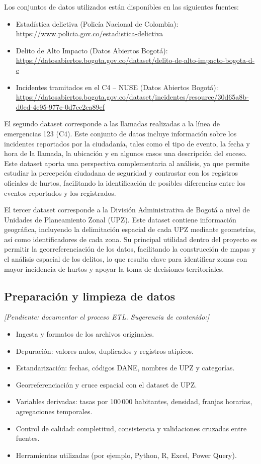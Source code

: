 \documentclass[12pt,letterpaper]{article}
\begin{document}
Los conjuntos de datos utilizados están disponibles en las siguientes fuentes:
\begin{itemize}[noitemsep, topsep=0pt]
    \item Estadística delictiva (Policía Nacional de Colombia): \url{https://www.policia.gov.co/estadistica-delictiva}
    \item Delito de Alto Impacto (Datos Abiertos Bogotá): \url{https://datosabiertos.bogota.gov.co/dataset/delito-de-alto-impacto-bogota-d-c}
    \item Incidentes tramitados en el C4 -- NUSE (Datos Abiertos Bogotá): \url{https://datosabiertos.bogota.gov.co/dataset/incidentes/resource/30d65a8b-d0ed-4e95-977e-0d7cc2ea89ef}
\end{itemize}

El segundo dataset corresponde a las llamadas realizadas a la línea de emergencias 123 (C4). Este conjunto de datos incluye información sobre los incidentes reportados por la ciudadanía, tales como el tipo de evento, la fecha y hora de la llamada, la ubicación y en algunos casos una descripción del suceso. Este dataset aporta una perspectiva complementaria al análisis, ya que permite estudiar la percepción ciudadana de seguridad y contrastar con los registros oficiales de hurtos, facilitando la identificación de posibles diferencias entre los eventos reportados y los registrados.

El tercer dataset corresponde a la División Administrativa de Bogotá a nivel de Unidades de Planeamiento Zonal (UPZ). Este dataset contiene información geográfica, incluyendo la delimitación espacial de cada UPZ mediante geometrías, así como identificadores de cada zona. Su principal utilidad dentro del proyecto es permitir la georreferenciación de los datos, facilitando la construcción de mapas y el análisis espacial de los delitos, lo que resulta clave para identificar zonas con mayor incidencia de hurtos y apoyar la toma de decisiones territoriales.

\subsection{Preparación y limpieza de datos}

\textit{[Pendiente: documentar el proceso ETL. Sugerencia de contenido:]}
\begin{itemize}
    \item Ingesta y formatos de los archivos originales.
    \item Depuración: valores nulos, duplicados y registros atípicos.
    \item Estandarización: fechas, códigos DANE, nombres de UPZ y categorías.
    \item Georreferenciación y cruce espacial con el dataset de UPZ.
    \item Variables derivadas: tasas por 100\,000 habitantes, densidad, franjas horarias, agregaciones temporales.
    \item Control de calidad: completitud, consistencia y validaciones cruzadas entre fuentes.
    \item Herramientas utilizadas (por ejemplo, Python, R, Excel, Power Query).
\end{itemize}
\end{document}
